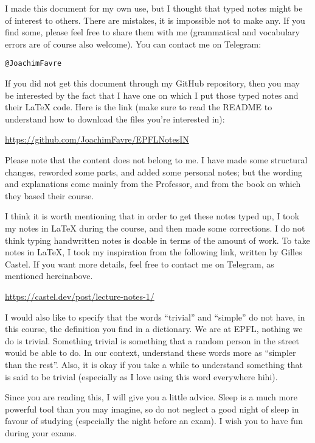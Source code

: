 I made this document for my own use, but I thought that typed notes might be of interest to others. There are mistakes, it is impossible not to make any. If you find some, please feel free to share them with me (grammatical and vocabulary errors are of course also welcome). You can contact me on Telegram:
\begin{center}
    \texttt{@JoachimFavre}
\end{center}

If you did not get this document through my GitHub repository, then you may be interested by the fact that I have one on which I put those typed notes and their \LaTeX{} code. Here is the link (make sure to read the README to understand how to download the files you're interested in):
\begin{center}
    \url{https://github.com/JoachimFavre/EPFLNotesIN}
\end{center}

Please note that the content does not belong to me. I have made some structural changes, reworded some parts, and added some personal notes; but the wording and explanations come mainly from the Professor, and from the book on which they based their course.

I think it is worth mentioning that in order to get these notes typed up, I took my notes in \LaTeX{} during the course, and then made some corrections. I do not think typing handwritten notes is doable in terms of the amount of work. To take notes in \LaTeX{}, I took my inspiration from the following link, written by Gilles Castel. If you want more details, feel free to contact me on Telegram, as mentioned hereinabove.
\begin{center}
    \url{https://castel.dev/post/lecture-notes-1/}
\end{center}

I would also like to specify that the words ``trivial'' and ``simple'' do not have, in this course, the definition you find in a dictionary. We are at EPFL, nothing we do is trivial. Something trivial is something that a random person in the street would be able to do. In our context, understand these words more as ``simpler than the rest''. Also, it is okay if you take a while to understand something that is said to be trivial (especially as I love using this word everywhere hihi).

Since you are reading this, I will give you a little advice. Sleep is a much more powerful tool than you may imagine, so do not neglect a good night of sleep in favour of studying (especially the night before an exam). I wish you to have fun during your exams.
